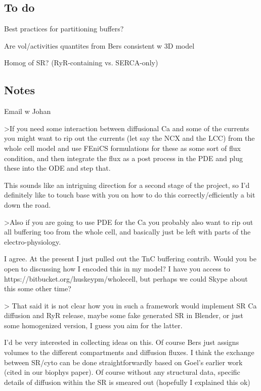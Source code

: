 \subsection{To do}
\lbi
\item Best practices for partitioning buffers?
\item Are vol/activities quantites from Bers consistent w 3D model 
\item Homog of SR? (RyR-containing vs. SERCA-only) 
\lei

\subsection{Notes}

Email w Johan

>If you need some interaction between diffusional Ca and some of the currents you might want to rip out the currents (let say the NCX and the LCC) from the whole cell model and use FEniCS formulations for these as some sort of flux condition, and then integrate the flux as a post process in the PDE and plug these into the ODE and step that.

This sounds like an intriguing direction for a second stage of the project, so I'd definitely like to touch base with you on how to do this correctly/efficiently a bit down the road. 

>Also if you are going to use PDE for the Ca you probably also want to rip out all buffering too from the whole cell, and basically just be left with parts of the electro-physiology.

I agree. At the present I just pulled out the TnC buffering contrib. Would you be open to discussing how I encoded this in my model? I have you access to https://bitbucket.org/huskeypm/wholecell, but perhaps we could Skype about this some other time? 
 
 
 > That said it is not clear how you in such a framework would implement SR Ca diffusion and RyR release, maybe some fake generated SR in Blender, or just some  homogenized version, I guess you aim for the latter.


I'd be very interested in collecting ideas on this. Of course Bers just assigns volumes to the different compartments and diffusion fluxes. I think the exchange between SR/cyto can be done straightforwardly based on Goel's earlier work (cited in our biophys paper).  Of course without any structural data, specific details of diffusion within the SR is smeared out (hopefully I explained this ok)

